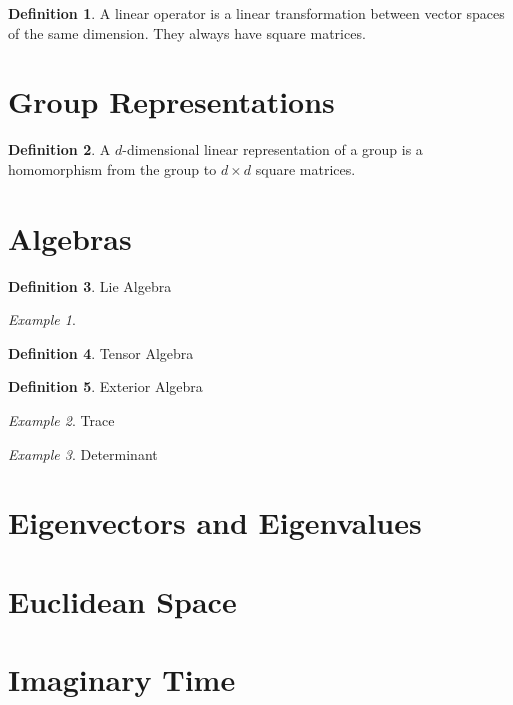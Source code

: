 \documentclass[12pt]{article}
\theoremstyle{definition}
\newtheorem{definition}{Definition}[section]
\theoremstyle{remark}
\theoremstyle{example}
\newtheorem{example}{Example}
\begin{document}
\begin{definition}
	A linear operator is a linear transformation between vector spaces of the same dimension. They always have square matrices.
\end{definition}

\section{Group Representations}

\begin{definition}
	A $d$-dimensional linear representation of a group is a homomorphism from the group to $d\times d$ square matrices.
\end{definition}

\section{Algebras}

\begin{definition}
	Lie Algebra
\end{definition}

\begin{example}
	
\end{example}

\begin{definition}
	Tensor Algebra
\end{definition}

\begin{definition}
	Exterior Algebra
\end{definition}

\begin{example}
	Trace
\end{example}

\begin{example}
	Determinant
\end{example}

\section{Eigenvectors and Eigenvalues}

\section{Euclidean Space}

\section{Imaginary Time}
\end{document}
